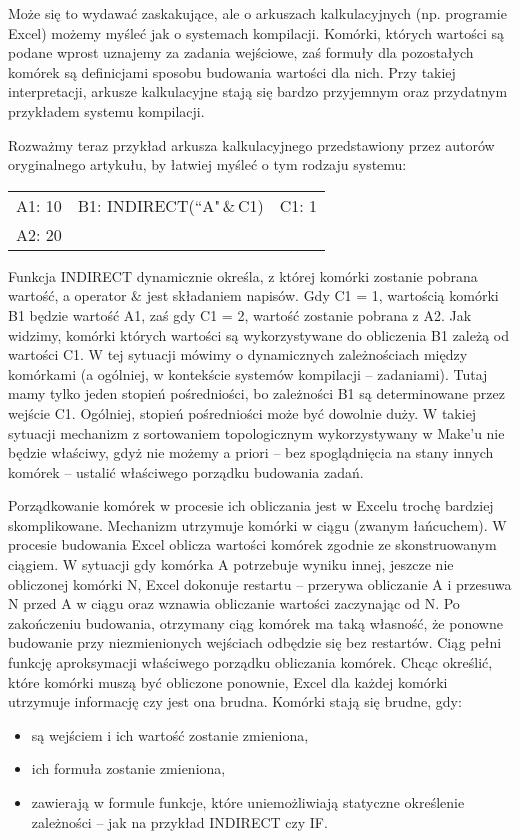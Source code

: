 Może się to wydawać zaskakujące, ale o arkuszach kalkulacyjnych (np. programie Excel) możemy myśleć jak o systemach kompilacji. Komórki, których wartości są podane wprost uznajemy za zadania wejściowe, zaś formuły dla pozostałych komórek są definicjami sposobu budowania wartości dla nich. Przy takiej interpretacji, arkusze kalkulacyjne stają się bardzo przyjemnym oraz przydatnym przykładem systemu kompilacji.

Rozważmy teraz przykład arkusza kalkulacyjnego przedstawiony przez autorów oryginalnego artykułu, by łatwiej myśleć o tym rodzaju systemu:

\begin{tabular}{ l c r }
  A1: 10 & B1: INDIRECT(``A"\,\&\,C1) & C1: 1 \\
  A2: 20 & &
\end{tabular}

Funkcja INDIRECT dynamicznie określa, z której komórki zostanie pobrana wartość, a operator \(\&\) jest składaniem napisów. Gdy C1 = 1, wartością komórki B1 będzie wartość A1, zaś gdy C1 = 2, wartość zostanie pobrana z A2. Jak widzimy, komórki których wartości są wykorzystywane do obliczenia B1 zależą od wartości C1. W tej sytuacji mówimy o dynamicznych zależnościach między komórkami (a ogólniej, w kontekście systemów kompilacji -- zadaniami). Tutaj mamy tylko jeden stopień pośredniości, bo zależności B1 są determinowane przez wejście C1. Ogólniej, stopień pośredniości może być dowolnie duży. W takiej sytuacji mechanizm z sortowaniem topologicznym wykorzystywany w Make'u nie będzie właściwy, gdyż nie możemy a priori -- bez spoglądnięcia na stany innych komórek -- ustalić właściwego porządku budowania zadań.

Porządkowanie komórek w procesie ich obliczania jest w Excelu trochę bardziej skomplikowane. Mechanizm utrzymuje komórki w ciągu (zwanym łańcuchem). W procesie budowania Excel oblicza wartości komórek zgodnie ze skonstruowanym ciągiem. W sytuacji gdy komórka A potrzebuje wyniku innej, jeszcze nie obliczonej komórki N, Excel dokonuje restartu -- przerywa obliczanie A i przesuwa N przed A w ciągu oraz wznawia obliczanie wartości zaczynając od N. Po zakończeniu budowania, otrzymany ciąg komórek ma taką własność, że ponowne budowanie przy niezmienionych wejściach odbędzie się bez restartów. Ciąg pełni funkcję aproksymacji właściwego porządku obliczania komórek. Chcąc określić, które komórki muszą być obliczone ponownie, Excel dla każdej komórki utrzymuje informację czy jest ona brudna. Komórki stają się brudne, gdy:
\begin{itemize}
\item są wejściem i ich wartość zostanie zmieniona,
\item ich formuła zostanie zmieniona,
\item zawierają w formule funkcje, które uniemożliwiają statyczne określenie zależności -- jak na przykład INDIRECT czy IF.
\end{itemize}

